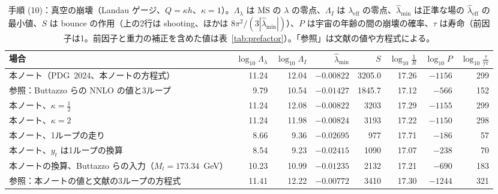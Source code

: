 \documentclass[a4paper,10pt]{ltjsarticle}
\newcommand{\MSbar}{\overline{\mathrm{MS}}}
\begin{document}
\begin{table}[tbp]
\centering\footnotesize
\caption{手順 (10)：真空の崩壊（Landau ゲージ、$Q=\kappa h$、$\kappa=1$）。$\Lambda_\lambda$ は $\MSbar$ の $\lambda$ の零点、$\Lambda_I$ は $\lambda_{\mathrm{eff}}$ の零点、$\hat\lambda_{\min}$ は正準な場の $\hat\lambda_{\mathrm{eff}}$ の最小値、$S$ は bounce の作用（上の2行は shooting、ほかは $8\pi^2/(3|\hat\lambda_{\min}|)$）、$P$ は宇宙の年齢の間の崩壊の確率、$\tau$ は寿命（前因子は1。前因子と重力の補正を含めた値は表~\ref{tab:prefactor}）。「参照」は文献の値や方程式による。}
\label{tab:decay}
\begin{tabularx}{\linewidth}{>{\raggedright\arraybackslash}Xrrrrrrr}
\toprule
場合 & $\log_{10}\Lambda_\lambda$ & $\log_{10}\Lambda_I$ & $\hat\lambda_{\min}$ & $S$ & $\log_{10}\frac1R$ & $\log_{10}P$ & $\log_{10}\frac\tau{\mathrm{yr}}$ \\
\midrule
本ノート（PDG~2024、本ノートの方程式） & 11.24 & 12.04 & $-0.00822$ & 3205.0 & 17.26 & $-1156$ & 299 \\
参照：Buttazzo らの NNLO の値と3ループ & 9.79 & 10.54 & $-0.01427$ & 1845.7 & 17.12 & $-566$ & 152 \\
\midrule
本ノート、$\kappa=\frac12$ & 11.24 & 12.08 & $-0.00822$ & 3203 & 17.29 & $-1155$ & 299 \\
本ノート、$\kappa=2$ & 11.24 & 11.98 & $-0.00824$ & 3193 & 17.22 & $-1150$ & 298 \\
本ノート、1ループの走り & 8.66 & 9.36 & $-0.02695$ & 977 & 17.71 & $-186$ & 57 \\
本ノート、$y_t$ は1ループの換算 & 8.54 & 9.23 & $-0.02415$ & 1090 & 17.07 & $-238$ & 70 \\
本ノートの換算、Buttazzo らの入力（$M_t=173.34$~GeV） & 10.23 & 10.99 & $-0.01235$ & 2132 & 17.21 & $-690$ & 183 \\
参照：本ノートの値と文献の3ループの方程式 & 11.41 & 12.22 & $-0.00772$ & 3410 & 17.30 & $-1244$ & 321 \\
\bottomrule
\end{tabularx}
\end{table}
\end{document}
